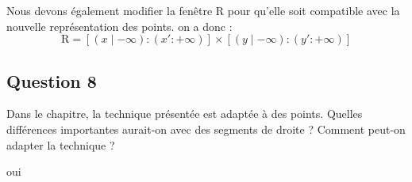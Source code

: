 \documentclass{article}
\begin{document}
Nous devons également modifier la fenêtre R pour qu'elle soit compatible avec la nouvelle représentation des points. 
on a donc :
\[
    \text{\^R} = [(x \mid - \infty) : (x':+\infty)] \times [(y \mid - \infty) : (y':+\infty)]   
\]


\subsection{Question 8} Dans le chapitre, la technique présentée est adaptée à des points. 
Quelles différences importantes aurait-on avec des segments de droite ? Comment peut-on adapter la technique ?

\bigskip

oui %
\end{document}
